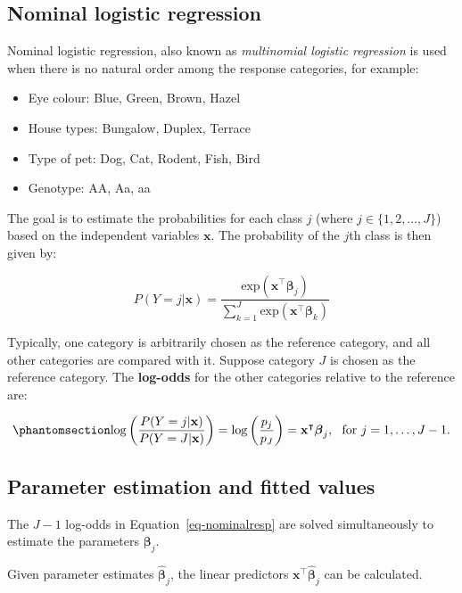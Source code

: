 \documentclass[
  letterpaper,
  DIV=11,
  numbers=noendperiod]{scrartcl}
\providecommand{\tightlist}{%
  \setlength{\itemsep}{0pt}\setlength{\parskip}{0pt}}\usepackage{longtable,booktabs,array}
\begin{document}
\subsection{Nominal logistic
regression}\label{nominal-logistic-regression}

Nominal logistic regression, also known as \emph{multinomial logistic
regression} is used when there is no natural order among the response
categories, for example:

\begin{itemize}
\tightlist
\item
  Eye colour: Blue, Green, Brown, Hazel
\item
  House types: Bungalow, Duplex, Terrace
\item
  Type of pet: Dog, Cat, Rodent, Fish, Bird
\item
  Genotype: AA, Aa, aa
\end{itemize}

The goal is to estimate the probabilities for each class \(j\) (where
\(j \in \{1,2,\ldots,J\}\)) based on the independent variables
\(\mathbf{x}\). The probability of the \(j\)th class is then given by:

\[
P(Y=j|\mathbf{x})= \dfrac{\mathrm{exp}(\mathbf{x}^\intercal \boldsymbol{\beta}_j)}{\sum_{k=1}^J\mathrm{exp}(\mathbf{x}^\intercal \boldsymbol{\beta}_k)}
\]

Typically, one category is arbitrarily chosen as the reference category,
and all other categories are compared with it. Suppose category \(J\) is
chosen as the reference category. The \textbf{log-odds} for the other
categories relative to the reference are:

\begin{equation}\phantomsection\label{eq-nominalresp}{
\mathrm{log}\left(\dfrac{P(Y=j|\mathbf{x})}{P(Y=J|\mathbf{x})}\right) = \mathrm{log}\left(\dfrac{p_j}{p_J}\right) =\mathbf{x}^\intercal\boldsymbol{\beta}_j, ~~\text{for } j=1,\dots,J-1.
}\end{equation}

\subsection{Parameter estimation and fitted
values}\label{parameter-estimation-and-fitted-values}

The \(J-1\) log-odds in Equation~\ref{eq-nominalresp} are solved
simultaneously to estimate the parameters \(\boldsymbol{\beta}_j\).

Given parameter estimates \(\hat{\boldsymbol{\beta}}_j\), the linear
predictors \(\mathbf{x}^\intercal\hat{\boldsymbol{\beta}}_j\) can be
calculated.
\end{document}
